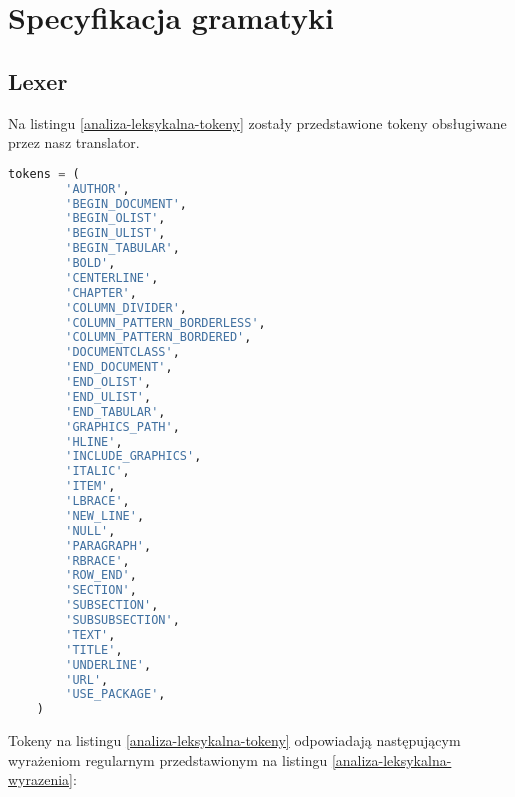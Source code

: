 \chapter{Specyfikacja gramatyki}


\section{Lexer}
Na listingu \ref{analiza-leksykalna-tokeny} zostały przedstawione tokeny obsługiwane przez nasz translator.

\begin{lstlisting}[language={Python}, caption={Analiza leksykalna - podział na tokeny}, label={analiza-leksykalna-tokeny}]
    tokens = (
        'AUTHOR',
        'BEGIN_DOCUMENT',
        'BEGIN_OLIST',
        'BEGIN_ULIST',
        'BEGIN_TABULAR',
        'BOLD',
        'CENTERLINE',
        'CHAPTER',
        'COLUMN_DIVIDER',
        'COLUMN_PATTERN_BORDERLESS',
        'COLUMN_PATTERN_BORDERED',
        'DOCUMENTCLASS',
        'END_DOCUMENT',
        'END_OLIST',
        'END_ULIST',
        'END_TABULAR',
        'GRAPHICS_PATH',
        'HLINE',
        'INCLUDE_GRAPHICS',
        'ITALIC',
        'ITEM',
        'LBRACE',
        'NEW_LINE',
        'NULL',
        'PARAGRAPH',
        'RBRACE',
        'ROW_END',
        'SECTION',
        'SUBSECTION',
        'SUBSUBSECTION',
        'TEXT',
        'TITLE',
        'UNDERLINE',
        'URL',
        'USE_PACKAGE',
    )
\end{lstlisting}

Tokeny na listingu \ref{analiza-leksykalna-tokeny} odpowiadają następującym wyrażeniom regularnym 
przedstawionym na listingu \ref{analiza-leksykalna-wyrazenia}:


